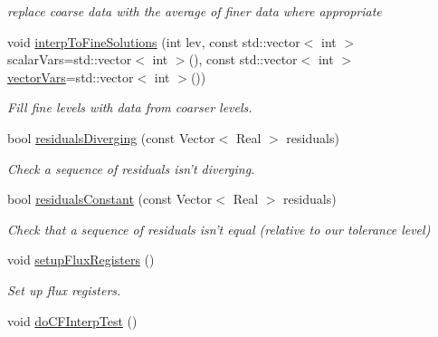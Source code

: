 \begin{DoxyCompactItemize}
\begin{DoxyCompactList}\small\item\em replace coarse data with the average of finer data where appropriate \end{DoxyCompactList}\item 
\hypertarget{classamr_mushy_layer_a54969e4eb65f804525820e4f13ab09b2}{void \hyperlink{classamr_mushy_layer_a54969e4eb65f804525820e4f13ab09b2}{interp\-To\-Fine\-Solutions} (int lev, const std\-::vector$<$ int $>$ scalar\-Vars=std\-::vector$<$ int $>$(), const std\-::vector$<$ int $>$ \hyperlink{classamr_mushy_layer_a0cf5dc1675842f2dcb139ba40f1f0ba0}{vector\-Vars}=std\-::vector$<$ int $>$())}\label{classamr_mushy_layer_a54969e4eb65f804525820e4f13ab09b2}

\begin{DoxyCompactList}\small\item\em Fill fine levels with data from coarser levels. \end{DoxyCompactList}\item 
\hypertarget{classamr_mushy_layer_a91c301183cfb40d065cf15f332de0056}{bool \hyperlink{classamr_mushy_layer_a91c301183cfb40d065cf15f332de0056}{residuals\-Diverging} (const Vector$<$ Real $>$ residuals)}\label{classamr_mushy_layer_a91c301183cfb40d065cf15f332de0056}

\begin{DoxyCompactList}\small\item\em Check a sequence of residuals isn't diverging. \end{DoxyCompactList}\item 
\hypertarget{classamr_mushy_layer_a1ddc3d2211b8610021a1520039af8ef9}{bool \hyperlink{classamr_mushy_layer_a1ddc3d2211b8610021a1520039af8ef9}{residuals\-Constant} (const Vector$<$ Real $>$ residuals)}\label{classamr_mushy_layer_a1ddc3d2211b8610021a1520039af8ef9}

\begin{DoxyCompactList}\small\item\em Check that a sequence of residuals isn't equal (relative to our tolerance level) \end{DoxyCompactList}\item 
\hypertarget{classamr_mushy_layer_a6ee5e0d648d50df048b2ad4f1caffdde}{void \hyperlink{classamr_mushy_layer_a6ee5e0d648d50df048b2ad4f1caffdde}{setup\-Flux\-Registers} ()}\label{classamr_mushy_layer_a6ee5e0d648d50df048b2ad4f1caffdde}

\begin{DoxyCompactList}\small\item\em Set up flux registers. \end{DoxyCompactList}\item 
\hypertarget{classamr_mushy_layer_a2c10fd1cc77ccb14d4d4c5c2806548dd}{void \hyperlink{classamr_mushy_layer_a2c10fd1cc77ccb14d4d4c5c2806548dd}{do\-C\-F\-Interp\-Test} ()}\label{classamr_mushy_layer_a2c10fd1cc77ccb14d4d4c5c2806548dd}


\end{DoxyCompactItemize}
